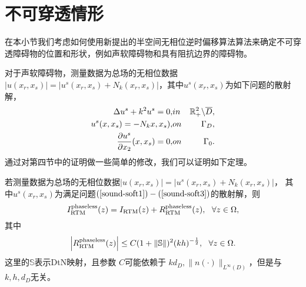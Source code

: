 \section{不可穿透情形}
在本小节我们考虑如何使用新提出的半空间无相位逆时偏移算法算法来确定不可穿透障碍物的位置和形状，例如声软障碍物和具有阻抗边界的障碍物。

对于声软障碍物，测量数据为总场的无相位数据$|u(x_r,x_s)|=
|u^s(x_r,x_s)+N_k(x_r,x_s)|$，其中$u^s(x_r,x_s)$为如下问题的散射解，
\begin{eqnarray}
 \Delta u^s+k^2u^s=0,&in& \mathbb{R}^2_+\backslash\overline{D},\label{sound-soft1}\\
  u^s(x,x_s)=-N_kx,x_s),&on& \Gamma_D,\label{sound-soft2}\\
  \frac{\partial u^s}{\partial x_2}(x,x_s)=0,&on& \Gamma_0\label{sound-soft3}.
\end{eqnarray}
通过对第四节中的证明做一些简单的修改，我们可以证明如下定理。
\begin{theorem}\label{thm:5.1}
若测量数据为总场的无相位数据$|u(x_r,x_s)|=|u^s(x_r,x_s)+N_k(x_r,x_s)|$， 其中$u^s(x_r,x_s)$为满足问题$(\ref{sound-soft1})
-(\ref{sound-soft3})$的散射解，则
\begin{equation*}
  I^{\rm phaseless}_{\rm RTM}(z)=I_{\rm RTM}(z)+ R^{\rm phaseless}_{\rm RTM}(z),\ \ \forall z\in\Omega,
\end{equation*}
其中 $$\left| R^{\rm phaseless}_{\rm RTM}(z)\right|\leq C(1 + \|\mathbb{S}\|)^2(kh)^{-\frac{1}{2}},\ \ \forall z\in\Omega.$$
这里的$\mathbb{S}$表示DtN映射，且参数 $C$可能依赖于 $kd_D, \|n(\cdot)\|_{L^\infty(D)}$，但是与$k,h,d_D$无关。
\end{theorem}

